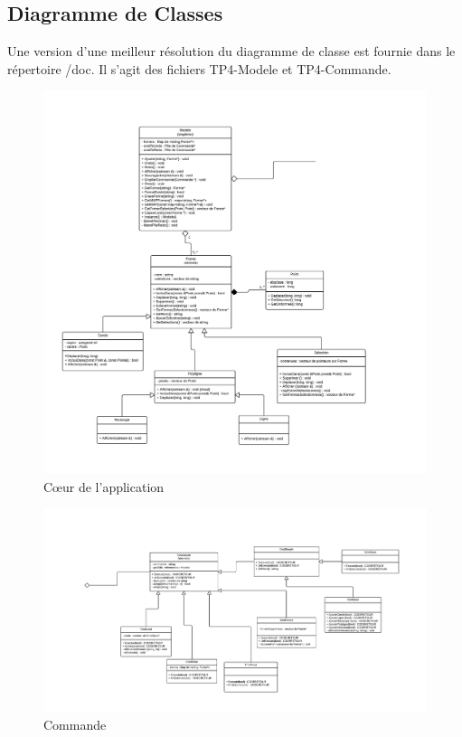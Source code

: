 \documentclass[12pt]{article}
\begin{document}
\subsection{Diagramme de Classes}
Une version d'une meilleur résolution du diagramme de classe est fournie dans le répertoire /doc. Il s'agit des fichiers TP4-Modele et TP4-Commande. 
\begin{figure}[!h]
\begin{center}
\includegraphics*[scale = 0.40]{Tp4-Modele.png}
\caption{C\oe{}ur de l'application}
\label{fig:Modele}

\end{center}
\end{figure}

\begin{figure}
\begin{center}
\includegraphics[scale = 0.44]{Tp4-Commande.png}
\caption{Commande}
\label{fig:Commande}
\end{center}
\end{figure}
\end{document}
